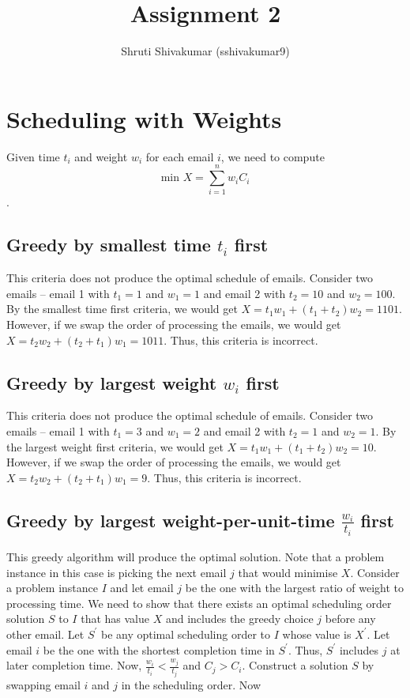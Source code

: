 \documentclass[10pt,a4paper]{article}
\title{Assignment 2}
\author{Shruti Shivakumar (sshivakumar9)}
\begin{document}
\maketitle

\section{Scheduling with Weights}
Given time $t_i$ and weight $w_i$ for each email $i$, we need to compute $$\text{min } X = \sum_{i=1}^{n} w_iC_i$$.
\subsection{Greedy by smallest time $t_i$ first}
This criteria does not produce the optimal schedule of emails. Consider two emails -- email 1 with $t_1 = 1$ and $w_1 = 1$ and email 2 with $t_2 = 10$ and $w_2 = 100$. By the smallest time first criteria, we would get $X = t_1w_1 + (t_1 + t_2)w_2 = 1101$. However, if we swap the order of processing the emails, we would get $X = t_2w_2 + (t_2 + t_1)w_1 = 1011$. Thus, this criteria is incorrect.
\subsection{Greedy by largest weight $w_i$ first}
This criteria does not produce the optimal schedule of emails. Consider two emails -- email 1 with $t_1 = 3$ and $w_1 = 2$ and email 2 with $t_2 = 1$ and $w_2 = 1$. By the largest weight first criteria, we would get $X = t_1w_1 + (t_1 + t_2)w_2 = 10$. However, if we swap the order of processing the emails, we would get $X = t_2w_2 + (t_2 + t_1)w_1 = 9$. Thus, this criteria is incorrect.
\subsection{Greedy by largest weight-per-unit-time $\frac{w_i}{t_i}$ first}
This greedy algorithm will produce the optimal solution. Note that a problem instance in this case is picking the next email $j$ that would minimise $X$. Consider a problem instance $I$ and let email $j$ be the one with the largest ratio of weight to processing time. We need to show that there exists an optimal scheduling order solution $S$ to $I$ that has value $X$ and includes the greedy choice $j$ before any other email. Let $S^\prime$ be any optimal scheduling order to $I$ whose value is $X^\prime$. Let email $i$ be the one with the shortest completion time in $S^\prime$. Thus, $S^\prime$ includes $j$ at later completion time. Now, $\frac{w_i}{t_i} < \frac{w_j}{t_j}$ and $C_j > C_i$. Construct a solution $S$ by swapping email $i$ and $j$ in the scheduling order. Now
\end{document}
